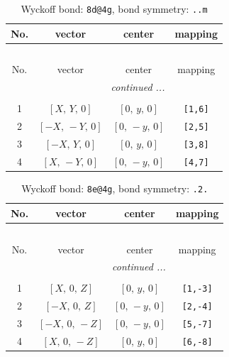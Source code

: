 \documentclass[fleqn,8pt]{jsarticle}
\begin{document}
\begin{longtable}{cccc}
\caption{Wyckoff bond: {\tt 8d@4g}, bond symmetry: {\tt ..m}}
 \\
 \hline \hline
No. & vector & center & mapping \\ \hline \endfirsthead

\multicolumn{3}{l}{\tablename\ \thetable{}} \\
 \hline \hline
No. & vector & center & mapping \\ \hline \endhead

 \hline \hline
\multicolumn{3}{r}{\footnotesize\it continued ...} \\ \endfoot

 \hline \hline
\multicolumn{3}{r}{} \\ \endlastfoot

1 & $\left[ X,\, Y,\, 0 \right]$ & $\left[ 0,\, y,\, 0 \right]$ & {\tt [1,6]} \\ \hline
2 & $\left[ - X,\, - Y,\, 0 \right]$ & $\left[ 0,\, - y,\, 0 \right]$ & {\tt [2,5]} \\ \hline
3 & $\left[ - X,\, Y,\, 0 \right]$ & $\left[ 0,\, y,\, 0 \right]$ & {\tt [3,8]} \\ \hline
4 & $\left[ X,\, - Y,\, 0 \right]$ & $\left[ 0,\, - y,\, 0 \right]$ & {\tt [4,7]} \\
\end{longtable}
\renewcommand{\arraystretch}{1.2}
\begin{longtable}{cccc}
\caption{Wyckoff bond: {\tt 8e@4g}, bond symmetry: {\tt .2.}}
 \\
 \hline \hline
No. & vector & center & mapping \\ \hline \endfirsthead

\multicolumn{3}{l}{\tablename\ \thetable{}} \\
 \hline \hline
No. & vector & center & mapping \\ \hline \endhead

 \hline \hline
\multicolumn{3}{r}{\footnotesize\it continued ...} \\ \endfoot

 \hline \hline
\multicolumn{3}{r}{} \\ \endlastfoot

1 & $\left[ X,\, 0,\, Z \right]$ & $\left[ 0,\, y,\, 0 \right]$ & {\tt [1,-3]} \\ \hline
2 & $\left[ - X,\, 0,\, Z \right]$ & $\left[ 0,\, - y,\, 0 \right]$ & {\tt [2,-4]} \\ \hline
3 & $\left[ - X,\, 0,\, - Z \right]$ & $\left[ 0,\, - y,\, 0 \right]$ & {\tt [5,-7]} \\ \hline
4 & $\left[ X,\, 0,\, - Z \right]$ & $\left[ 0,\, y,\, 0 \right]$ & {\tt [6,-8]} \\
\end{longtable}
\end{document}
